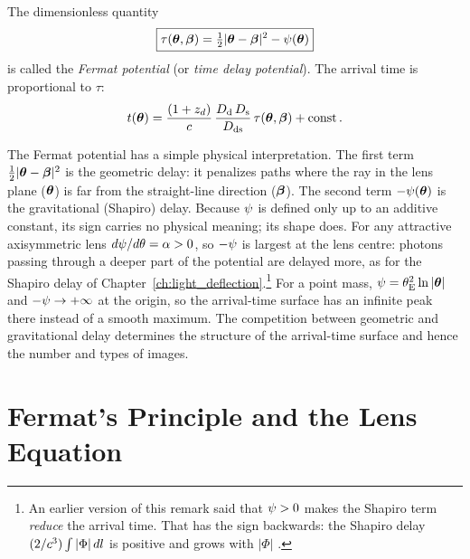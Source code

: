 \begin{definition}
The dimensionless quantity
\begin{equation}
    \boxed{
    \tau(\boldsymbol{\theta}, \boldsymbol{\beta}) = \tfrac{1}{2}|\boldsymbol{\theta} - \boldsymbol{\beta}|^2
    - \psi(\boldsymbol{\theta})
    }
    \label{eq:fermat_potential}
\end{equation}
is called the \emph{Fermat potential} (or \emph{time delay
potential}).  The arrival time is proportional to $\tau$:
\begin{equation}
    t(\boldsymbol{\theta}) = \frac{(1 + z_d)}{c}\,
    \frac{D_{\mathrm{d}}\,D_{\mathrm{s}}}{D_{\mathrm{ds}}}\, \tau(\boldsymbol{\theta}, \boldsymbol{\beta})
    + \text{const} \,.
    \label{eq:t_tau_relation}
\end{equation}
\end{definition}

\begin{remark}
The Fermat potential has a simple physical interpretation.  The first
term $\tfrac{1}{2}|\boldsymbol{\theta} - \boldsymbol{\beta}|^2$ is the geometric delay: it penalizes
paths where the ray in the lens plane ($\boldsymbol{\theta}$) is far from the
straight-line direction ($\boldsymbol{\beta}$).  The second term $-\psi(\boldsymbol{\theta})$
is the gravitational (Shapiro) delay.  Because $\psi$ is defined only up
to an additive constant, its sign carries no physical meaning; its shape
does.  For any attractive axisymmetric lens $d\psi/d\theta = \alpha > 0$,
so $-\psi$ is largest at the lens centre: photons passing through a
deeper part of the potential are delayed more, as for the Shapiro delay
of Chapter~\ref{ch:light_deflection}.\footnote{An
earlier version of this remark said that $\psi>0$ makes the
Shapiro term \emph{reduce} the arrival time.  That has the sign
backwards: the Shapiro delay $(2/c^3)\int|\Phi|\,dl$
is positive and grows with $|\Phi|$
\citep[eq.~3]{narayan_lectures_1997}.}  For a point mass,
$\psi = \theta_{\mathrm{E}}^2\ln|\boldsymbol{\theta}|$ and $-\psi\to+\infty$ at the origin,
so the arrival-time surface has an infinite peak there instead of a
smooth maximum.  The competition between geometric and gravitational
delay determines the structure of the arrival-time surface and hence the
number and types of images.
\end{remark}


\section{Fermat's Principle and the Lens Equation}
\label{sec:fermat_principle}

